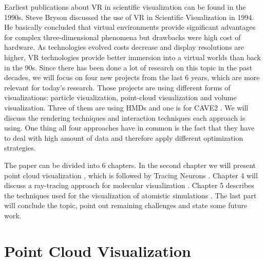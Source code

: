 \documentclass[10pt,twocolumn,letterpaper]{article}
\begin{document}
\setlength{\parindent}{1pc}Earliest publications about VR in scientific visualization can be found in the 1990s. Steve Bryson \cite{bryson1994virtual} discussed the use of VR in Scientific Visualization in 1994. He basically concluded that virtual environments provide significant advantages for complex three-dimensional phenomena but drawbacks were high cost of hardware. As technologies evolved costs decrease and display resolutions are higher, VR technologies provide better immersion into a virtual worlds than back in the 90s. Since there has been done a lot of research on this topic in the past decades, we will focus on four new projects from the last 6 years, which are more relevant for today's research. Those projects are using different forms of visualizations: particle visualization, point-cloud visualization and volume visualization. Three of them are using HMDs and one is for CAVE2 \cite{febretti2013cave2}. We will discuss the rendering techniques and interaction techniques each approach is using. One thing all four approaches have in common is the fact that they have to deal with high amount of data and therefore apply different optimization strategies.

\setlength{\parindent}{1pc}The paper can be divided into 6 chapters. In the second chapter we will present point cloud visualization \cite{discher_point-based_2018}, which is followed by Tracing Neurons \cite{}. Chapter 4 will discuss a ray-tracing approach for molecular visualization \cite{}. Chapter 5 describes the techniques used for the visualization of atomistic simulations \cite{reda_visualizing_2013}. The last part will conclude the topic, point out remaining challenges and state some future work.

\section{Point Cloud Visualization}
\end{document}
